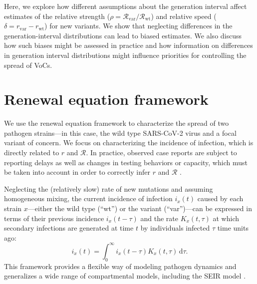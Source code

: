 \documentclass[12pt]{article}
\newcommand{\vvvar}{\mathrm{var}}
\newcommand{\wwwt}{\mathrm{wt}}
\newcommand{\rx}[1]{\ensuremath{{r}_{#1}}\xspace}
\newcommand{\rw}{\rx{\wwwt}}
\newcommand{\rv}{\rx{\vvvar}}
\newcommand{\Rx}[1]{\ensuremath{{\mathcal R}_{#1}}\xspace}
\newcommand{\RR}{\ensuremath{{\mathcal R}}\xspace}
\newcommand{\Rw}{\Rx{\wwwt}}
\newcommand{\Rv}{\Rx{\vvvar}}
\newcommand{\dd}[1]{\ensuremath{\, \mathrm{d}#1}}
\newcommand{\dtau}{\dd{\tau}}
\begin{document}
Here, we explore how different assumptions about the generation interval affect estimates of the relative strength ($\rho=\Rv/\Rw$) and relative speed ($\delta=\rv-\rw$) for new variants.
We show that neglecting differences in the generation-interval distributions can lead to biased estimates.
We also discuss how such biases might be assessed in practice and how information on differences in generation interval distributions might influence priorities for controlling the spread of VoCs.

\section{Renewal equation framework}

We use the renewal equation framework to characterize the spread of two pathogen strains---in this case, the wild type SARS-CoV-2 virus and a focal variant of concern.
We focus on characterizing the incidence of infection, which is directly related to $r$ and $\RR$.
In practice, observed case reports are subject to reporting delays as well as changes in testing behaviors or capacity, which must be taken into account in order to correctly infer $r$ and $\RR$ \citep{goldstein2009reconstructing,gostic2020practical}.

Neglecting the (relatively slow) rate of new mutations and assuming homogeneous mixing, the current incidence of infection $i_x(t)$ caused by each strain $x$---either the wild type (``wt'') or the variant (``var'')---can be expressed in terms of their previous incidence $i_x(t-\tau)$ and the rate $K_x(t, \tau)$ at which secondary infections are generated at time $t$ by individuals infected $\tau$ time units ago:
\begin{equation}
i_x(t) = \int_0^\infty i_x(t-\tau) K_x(t, \tau) \dtau.
\end{equation}
This framework provides a flexible way of modeling pathogen dynamics and generalizes a wide range of compartmental models, including the SEIR model \citep{heesterbeek1996concept, diekmann2000mathematical, roberts2004modelling, aldis2005integral,breda2012formulation, champredon2018equivalence}.
\end{document}
